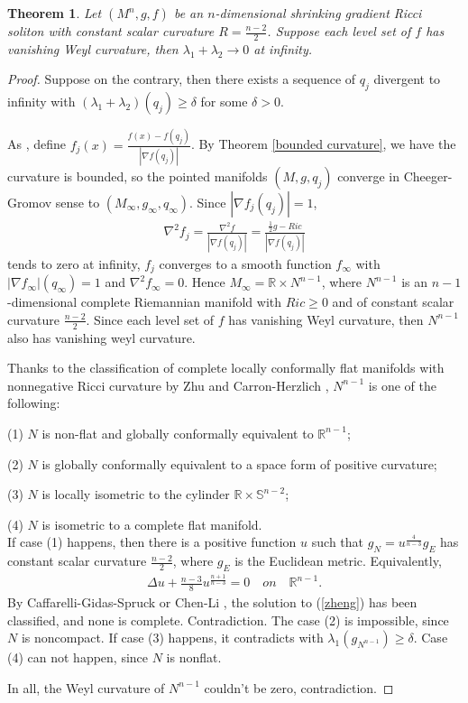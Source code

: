 \documentclass[12pt]{amsart}
\newcommand{\ba}{\begin{eqnarray}}
\newcommand{\ea}{\end{eqnarray}}
\newcommand{\ban}{\begin{eqnarray*}}
\newcommand{\ean}{\end{eqnarray*}}
\newtheorem{theo}{Theorem}[section]
\begin{document}
\begin{theo}
	Let $(M^n, g, f)$ be an $n$-dimensional shrinking gradient Ricci soliton with constant scalar curvature $R=\frac{n-2}{2}$.  Suppose each level set of $f$ has vanishing Weyl curvature, then $\lambda_1+\lambda_2\rightarrow 0$ at infinity.
\end{theo}

\begin{proof}
	Suppose on the contrary, then there exists a sequence of $q_j$ divergent to infinity with $(\lambda_1+\lambda_2)(q_j)\geq \delta$ for some $\delta>0$.
	
	\smallskip
	As \cite{Naber}, define $f_j(x)=\frac{f(x)-f(q_j)}{|\nabla f(q_j)|}$. By Theorem \ref{bounded curvature}, we have the curvature is bounded, so the pointed manifolds $(M, g, q_j)$ converge in Cheeger-Gromov sense to $(M_\infty, g_\infty, q_\infty)$. Since  $|\nabla f_j(q_j)|=1$,
	\ban
	\nabla^2 f_j=\frac{\nabla^2 f}{|\nabla f(q_j)|}=\frac{\frac{1}{2}g-Ric}{|\nabla f(q_j)|}
	\ean
	tends to zero at infinity,  $f_j$ converges to a smooth function $f_\infty$ with $|\nabla f_\infty|(q_\infty)=1$ and $\nabla^2 f_\infty =0$. Hence $M_\infty=\mathbb{R}\times N^{n-1}$, where $N^{n-1}$ is an $n-1$-dimensional complete Riemannian manifold with $Ric\geq 0$ and of constant scalar curvature $\frac{n-2}{2}$. Since each level set of $f$ has vanishing Weyl curvature, then $N^{n-1}$ also has vanishing weyl curvature.
	
	
	
	\smallskip
	Thanks to the classification of complete locally conformally flat manifolds
	with nonnegative Ricci curvature by Zhu \cite{Zhu} and Carron-Herzlich \cite{Carron-Herzlic}, $N^{n-1}$ is
	one of the following:
	
	\smallskip
	(1) $N$ is non-flat and globally conformally equivalent to $\mathbb{R}^{n-1}$;
	
	\smallskip
	(2)  $N$ is globally conformally equivalent to a space form of positive curvature;
	
	\smallskip
	(3)  $N$ is locally isometric to the cylinder $\mathbb{R}\times \mathbb{S}^{n-2}$;
	
	\smallskip
	(4)   $N$ is isometric to a complete flat manifold.\\
	
	If  case (1) happens, then there is a positive function $u$ such that $g_N=u^{\frac{4}{n-3}} g_{E}$ has constant scalar curvature $\frac{n-2}{2}$, where $g_E$ is the Euclidean metric.  Equivalently,
	\ba\label{zheng}
	\Delta u+\frac{n-3}{8} u^{\frac{n+1}{n-3}} =0 \quad on \quad  \mathbb{R}^{n-1}.
	\ea
	By  Caffarelli-Gidas-Spruck \cite{Caffarelli-Gidas-Spruck} or Chen-Li \cite{Chen-Li}, the solution to (\ref{zheng}) has been classified, and none is complete.  Contradiction. The case (2) is impossible, since $N$ is noncompact. If case (3) happens,  it contradicts with $\lambda_1(g_{N^{n-1}})\geq \delta$.  Case (4) can not happen, since $N$ is nonflat.
	
	In all, the Weyl curvature of $N^{n-1}$ couldn't be zero, contradiction.
\end{proof}
\end{document}
